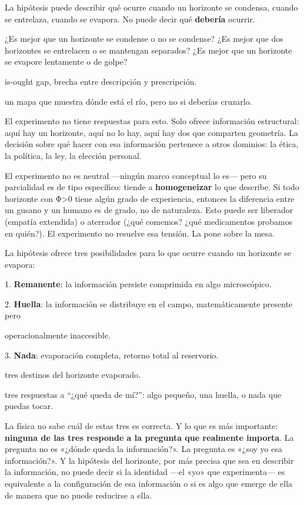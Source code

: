 \noindent La hipótesis puede describir qué ocurre cuando un horizonte se condensa, cuando se entrelaza, cuando se evapora. No puede decir qué \textbf{debería} ocurrir.

¿Es mejor que un horizonte se condense o no se condense? ¿Es mejor que dos horizontes se entrelacen o se mantengan separados? ¿Es mejor que un horizonte se evapore lentamente o de golpe?

\begin{fisica}
 is-ought gap, brecha entre descripción y prescripción.

 un mapa que muestra dónde está el río, pero no si deberías cruzarlo.
\end{fisica}
El experimento no tiene respuestas para esto. Solo ofrece información estructural: aquí hay un horizonte, aquí no lo hay, aquí hay dos que comparten geometría. La decisión sobre qué hacer con esa información pertenece a otros dominios: la ética, la política, la ley, la elección personal.

El experimento no es neutral —ningún marco conceptual lo es— pero su parcialidad es de tipo específico: tiende a \textbf{homogeneizar} lo que describe. Si todo horizonte con Φ>0 tiene algún grado de experiencia, entonces la diferencia entre un gusano y un humano es de grado, no de naturaleza. Esto puede ser liberador (empatía extendida) o aterrador (¿qué comemos? ¿qué medicamentos probamos en quién?). El experimento no resuelve esa tensión. La pone sobre la mesa.

\noindent La hipótesis ofrece tres posibilidades para lo que ocurre cuando un horizonte se evapora:

1. \textbf{Remanente}: la información persiste comprimida en algo microscópico.

2. \textbf{Huella}: la información se distribuye en el campo, matemáticamente presente pero

operacionalmente inaccesible.

3. \textbf{Nada}: evaporación completa, retorno total al reservorio.

\begin{fisica}
 tres destinos del horizonte evaporado.

 tres respuestas a “¿qué queda de mí?”: algo pequeño, una huella, o nada que puedas tocar.
\end{fisica}
La física no sabe cuál de estas tres es correcta. Y lo que es más importante: \textbf{ninguna de las tres responde a la pregunta que realmente importa}. La pregunta no es «¿dónde queda la información?». La pregunta es «¿soy yo esa información?». Y la hipótesis del horizonte, por más precisa que sea en describir la información, no puede decir si la identidad —el «yo» que experimenta— es equivalente a la configuración de esa información o si es algo que emerge de ella de manera que no puede reducirse a ella.

